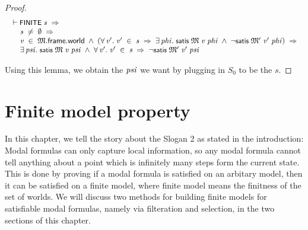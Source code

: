 \documentclass[letterpaper]{article}
\renewcommand{\HOLConst}[1]{{\textsf{\upshape\small #1}}}
\renewcommand{\HOLinline}[1]{\ensuremath{#1}}
\newenvironment{holmath}{\begin{displaymath}\begin{array}{l}}{\end{array}\end{displaymath}\ignorespacesafterend}
\begin{document}
\begin{proof}
\begin{holmath}
  \ensuremath{\HOLTokenTurnstile}\HOLConst{FINITE}\;\HOLFreeVar{s}\;\HOLSymConst{\HOLTokenImp{}}\\
\;\;\;\;\;\HOLFreeVar{s}\;\HOLSymConst{\HOLTokenNotEqual{}}\;\HOLSymConst{\HOLTokenEmpty{}}\;\HOLSymConst{\HOLTokenImp{}}\\
\;\;\;\;\;\HOLFreeVar{v}\;\HOLSymConst{\HOLTokenIn{}}\;\HOLFreeVar{\ensuremath{\mathfrak{M}}}.\HOLFieldName{frame}.\HOLFieldName{world}\;\HOLSymConst{\HOLTokenConj{}}\;(\HOLSymConst{\HOLTokenForall{}}\HOLBoundVar{v\sp{\prime}}.\;\HOLBoundVar{v\sp{\prime}}\;\HOLSymConst{\HOLTokenIn{}}\;\HOLFreeVar{s}\;\HOLSymConst{\HOLTokenImp{}}\;\HOLSymConst{\HOLTokenExists{}}\HOLBoundVar{phi}.\;\HOLConst{satis}\;\HOLFreeVar{\ensuremath{\mathfrak{M}}}\;\HOLFreeVar{v}\;\HOLBoundVar{phi}\;\HOLSymConst{\HOLTokenConj{}}\;\HOLSymConst{\HOLTokenNeg{}}\HOLConst{satis}\;\HOLFreeVar{\ensuremath{\mathfrak{M}'}}\;\HOLBoundVar{v\sp{\prime}}\;\HOLBoundVar{phi})\;\HOLSymConst{\HOLTokenImp{}}\\
\;\;\;\;\;\HOLSymConst{\HOLTokenExists{}}\HOLBoundVar{psi}.\;\HOLConst{satis}\;\HOLFreeVar{\ensuremath{\mathfrak{M}}}\;\HOLFreeVar{v}\;\HOLBoundVar{psi}\;\HOLSymConst{\HOLTokenConj{}}\;\HOLSymConst{\HOLTokenForall{}}\HOLBoundVar{v\sp{\prime}}.\;\HOLBoundVar{v\sp{\prime}}\;\HOLSymConst{\HOLTokenIn{}}\;\HOLFreeVar{s}\;\HOLSymConst{\HOLTokenImp{}}\;\HOLSymConst{\HOLTokenNeg{}}\HOLConst{satis}\;\HOLFreeVar{\ensuremath{\mathfrak{M}'}}\;\HOLBoundVar{v\sp{\prime}}\;\HOLBoundVar{psi}
\end{holmath}
 
Using this lemma, we obtain the \HOLinline{\HOLFreeVar{psi}} we want by plugging in $S_0$ to be the $s$. 
\end{proof}

\section{Finite model property}

In this chapter, we tell the story about the Slogan 2 as stated in the introduction: Modal formulas can only capture local information, so any modal formula cannot tell anything about a point which is infinitely many steps form the current state. This is done by proving if a modal formula is satisfied on an arbitary model, then it can be satisfied on a finite model, where finite model means the finitness of the set of worlds. We will discuss two methods for building finite models for satisfiable modal formulas, namely via filteration and selection, in the two sections of this chapter. 
\end{document}
